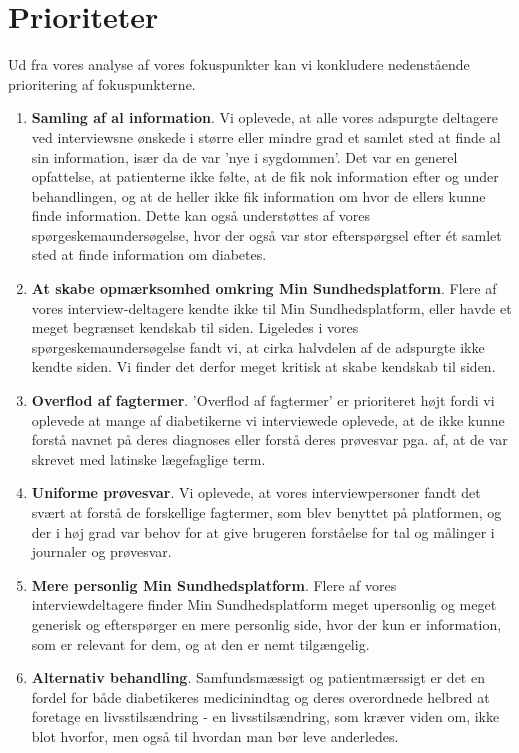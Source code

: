 \section{Prioriteter}
Ud fra vores analyse af vores fokuspunkter kan vi konkludere  nedenstående prioritering af fokuspunkterne.\\
\begin{enumerate}
	\item \textbf{Samling af al information}. Vi oplevede, at alle vores adspurgte deltagere ved interviewsne ønskede i større eller mindre grad et samlet sted at finde al sin information, især da de var 'nye i sygdommen'. Det var en generel opfattelse, at patienterne ikke følte, at de fik nok information efter og under behandlingen, og at de heller ikke fik information om hvor de ellers kunne finde information. Dette kan også understøttes af vores spørgeskemaundersøgelse, hvor der også var stor efterspørgsel efter ét samlet sted at finde information om diabetes.
	\item \textbf{At skabe opmærksomhed omkring Min Sundhedsplatform}. Flere af vores interview-deltagere kendte ikke til Min Sundhedsplatform, eller havde et meget begrænset kendskab til siden. Ligeledes i vores spørgeskemaundersøgelse fandt vi, at cirka halvdelen af de adspurgte ikke kendte siden. Vi finder det derfor meget kritisk at skabe kendskab til siden.
	\item \textbf{Overflod af fagtermer}. 'Overflod af fagtermer' er prioriteret højt fordi vi oplevede at mange af diabetikerne vi interviewede oplevede, at de ikke kunne forstå navnet på deres diagnoses eller forstå deres prøvesvar pga. af, at de var skrevet med latinske lægefaglige term.
	\item \textbf{Uniforme prøvesvar}. Vi oplevede, at vores interviewpersoner fandt det svært at forstå de forskellige fagtermer, som blev benyttet på platformen, og der i høj grad var behov for at give brugeren forståelse for tal og målinger i journaler og prøvesvar.
	\item \textbf{Mere personlig Min Sundhedsplatform}. Flere af vores interviewdeltagere finder Min Sundhedsplatform meget upersonlig og meget generisk og efterspørger en mere personlig side, hvor der kun er information, som er relevant for dem, og at den er nemt tilgængelig.
	\item \textbf{Alternativ behandling}. Samfundsmæssigt og patientmærssigt er det en fordel for både diabetikeres medicinindtag og deres overordnede helbred at foretage en livsstilsændring - en livsstilsændring, som kræver viden om, ikke blot hvorfor, men også til hvordan man bør leve anderledes.

\end{enumerate}
